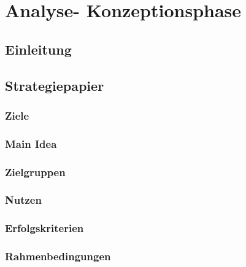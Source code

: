 \documentclass[a4paper,12pt]{article}
\title{\projektName}
\author{\authorName}
\date{\today}
\begin{document}
    
    \setcounter{page}{2}
    \setcounter{tocdepth}{4}
    \setcounter{secnumdepth}{4}
    \tableofcontents
    \clearpage
 
	\begin{abstract}
		Abstrakte Beschreibung.
	\end{abstract}	
	\clearpage
 
	\section{Analyse- Konzeptionsphase}
 	
		\subsection{Einleitung} %
 		
 		
		\subsection{Strategiepapier}
				\subsubsection{Ziele}
				
				
				\subsubsection{Main Idea}
				
				
				\subsubsection{Zielgruppen}
				
				
				\subsubsection{Nutzen}
				
				
				\subsubsection{Erfolgskriterien}
				
								
				\subsubsection{Rahmenbedingungen}
				
				
\end{document}
